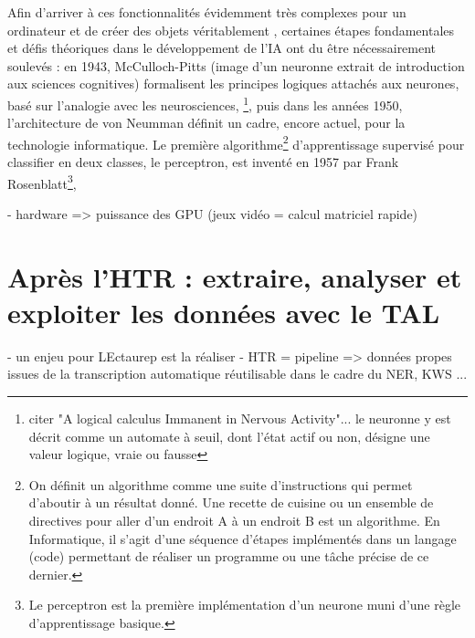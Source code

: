 Afin d'arriver à ces fonctionnalités évidemment très complexes pour un ordinateur et de créer des objets véritablement , certaines étapes fondamentales et défis théoriques dans le développement de l'IA ont du être nécessairement soulevés : en 1943, McCulloch-Pitts (image d'un neuronne extrait de introduction aux sciences cognitives) formalisent les principes logiques attachés aux neurones, basé sur l'analogie avec les neurosciences, \footnote{citer "A logical calculus Immanent in Nervous Activity"... le neuronne y est décrit comme un automate à seuil, dont l'état actif ou non, désigne une valeur logique, vraie ou fausse}, puis dans les années 1950, l'architecture de von Neumman définit un cadre, encore actuel, pour la technologie informatique. Le première algorithme\footnote{On définit un algorithme comme une suite d'instructions qui permet d'aboutir à un résultat donné. Une recette de cuisine ou un ensemble de directives pour aller d'un endroit A à un endroit B est un algorithme. En Informatique, il s'agit d'une séquence d'étapes implémentés dans un langage (code) permettant de réaliser un programme ou une tâche précise de ce dernier.} d'apprentissage supervisé pour classifier en deux classes, le perceptron, est inventé en 1957 par Frank Rosenblatt\footnote{Le perceptron est la première implémentation d'un neurone muni d'une règle d'apprentissage basique.},  

- hardware => puissance des GPU (jeux vidéo = calcul matriciel rapide)

\section{Après l'HTR : extraire, analyser et exploiter les données avec le TAL}

- un enjeu pour LEctaurep est la réaliser 
- HTR = pipeline => données propes issues de la transcription automatique réutilisable dans le cadre du NER, KWS ...